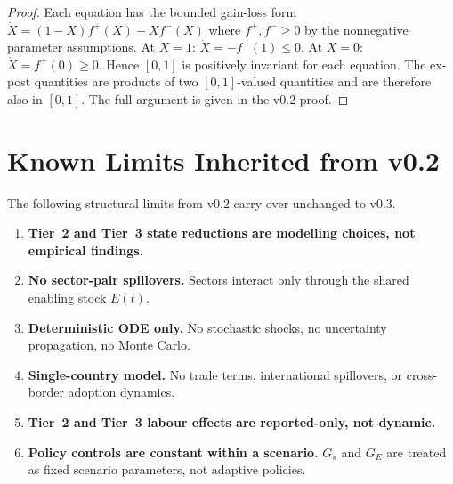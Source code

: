 \documentclass[11pt,a4paper]{article}
\begin{document}
\begin{proof}
Each equation has the bounded gain-loss form $\dot{X} = (1-X) f^+(X) - X f^-(X)$ where $f^+, f^- \geq 0$ by the nonnegative parameter assumptions. At $X = 1$: $\dot{X} = -f^-(1) \leq 0$. At $X = 0$: $\dot{X} = f^+(0) \geq 0$. Hence $[0,1]$ is positively invariant for each equation. The ex-post quantities are products of two $[0,1]$-valued quantities and are therefore also in $[0,1]$. The full argument is given in the v0.2 proof.
\end{proof}

\section{Known Limits Inherited from v0.2}
\label{sec:limits_v02}

The following structural limits from v0.2 carry over unchanged to v0.3.

\begin{enumerate}[label=\arabic*.]

  \item \textbf{Tier~2 and Tier~3 state reductions are modelling choices, not empirical findings.}

  \item \textbf{No sector-pair spillovers.}
  Sectors interact only through the shared enabling stock $E(t)$.

  \item \textbf{Deterministic ODE only.}
  No stochastic shocks, no uncertainty propagation, no Monte Carlo.

  \item \textbf{Single-country model.}
  No trade terms, international spillovers, or cross-border adoption dynamics.

  \item \textbf{Tier~2 and Tier~3 labour effects are reported-only, not dynamic.}

  \item \textbf{Policy controls are constant within a scenario.}
  $G_s$ and $G_E$ are treated as fixed scenario parameters, not adaptive policies.

\end{enumerate}

\end{document}
